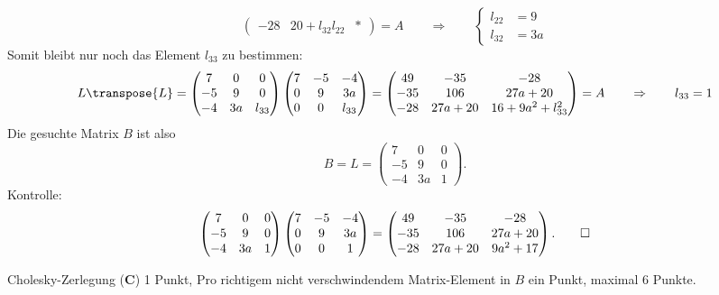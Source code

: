 \begin{loesung}
\[\begin{pmatrix}
-28& 20+l_{32}l_{22}&         *
\end{pmatrix}
=
A
\qquad\Rightarrow\qquad
\left\{
\begin{aligned}
l_{22}&=9\\
l_{32}&=3a
\end{aligned}
\right.
\]
Somit bleibt nur noch das Element $l_{33}$ zu bestimmen:
\[
L\transpose{L}=
\begin{pmatrix}
7&     0&0\\
-5&9&0\\
-4&3a&l_{33}
\end{pmatrix}
\begin{pmatrix}
7&    -5&    -4\\
0&9&3a\\
0&     0&l_{33}
\end{pmatrix}
=
\begin{pmatrix}
49&-35 & -28\\
-35&106 &27a+20\\
-28&27a+20&  16+9a^2+l_{33}^2
\end{pmatrix}
=
A
\qquad\Rightarrow\qquad
l_{33}=1
\]
Die gesuchte Matrix $B$ ist also
\[
B = L=
\begin{pmatrix}
7&     0&0\\
-5&9&0\\
-4&3a&1
\end{pmatrix}.
\]
Kontrolle:
\[
\begin{pmatrix}
7&     0&0\\
-5&9&0\\
-4&3a&1
\end{pmatrix}
\begin{pmatrix}
7&  -5& -4\\
0&9&3a\\
0& 0&1
\end{pmatrix}
=
\begin{pmatrix}
49& -35&-28\\
-35&106&27a + 20\\
-28&27a + 20&9a^2 + 17
\end{pmatrix}.
\qedhere
\]
\end{loesung}

\begin{bewertung}
Cholesky-Zerlegung ({\bf C}) 1 Punkt,
Pro richtigem nicht verschwindendem Matrix-Element in $B$ ein Punkt,
maximal 6 Punkte.
\end{bewertung}

